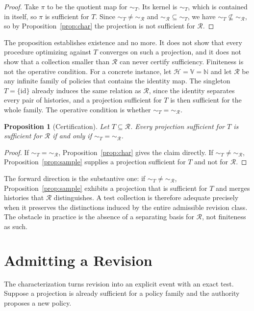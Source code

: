 \documentclass[11pt]{article}
\newtheorem{proposition}{Proposition}
\theoremstyle{remark}
\newcommand{\Hist}{\mathcal{H}}
\newcommand{\Rev}{\mathcal{R}}
\newcommand{\Vset}{\mathbb{V}}
\begin{document}
\begin{proof}
Take $\pi$ to be the quotient map for $\sim_T$. Its kernel is $\sim_T$, which is contained in itself, so $\pi$ is sufficient for $T$. Since $\sim_T\ne\sim_{\Rev}$ and $\sim_{\Rev}\subseteq\sim_T$, we have $\sim_T\not\subseteq\sim_{\Rev}$, so by Proposition~\ref{prop:char} the projection is not sufficient for $\Rev$.
\end{proof}

The proposition establishes existence and no more. It does not show that every procedure optimizing against $T$ converges on such a projection, and it does not show that a collection smaller than $\Rev$ can never certify sufficiency. Finiteness is not the operative condition. For a concrete instance, let $\Hist=\Vset=\mathbb{N}$ and let $\Rev$ be any infinite family of policies that contains the identity map. The singleton $T=\{\mathrm{id}\}$ already induces the same relation as $\Rev$, since the identity separates every pair of histories, and a projection sufficient for $T$ is then sufficient for the whole family. The operative condition is whether $\sim_T=\sim_{\Rev}$.

\begin{proposition}[Certification]\label{prop:cert}
Let $T\subseteq\Rev$. Every projection sufficient for $T$ is sufficient for $\Rev$ if and only if $\sim_T=\sim_{\Rev}$.
\end{proposition}

\begin{proof}
If $\sim_T=\sim_{\Rev}$, Proposition~\ref{prop:char} gives the claim directly. If $\sim_T\ne\sim_{\Rev}$, Proposition~\ref{prop:sample} supplies a projection sufficient for $T$ and not for $\Rev$.
\end{proof}

The forward direction is the substantive one: if $\sim_T\ne\sim_{\Rev}$, Proposition~\ref{prop:sample} exhibits a projection that is sufficient for $T$ and merges histories that $\Rev$ distinguishes. A test collection is therefore adequate precisely when it preserves the distinctions induced by the entire admissible revision class. The obstacle in practice is the absence of a separating basis for $\Rev$, not finiteness as such.

\section{Admitting a Revision}\label{sec:admit}

The characterization turns revision into an explicit event with an exact test. Suppose a projection is already sufficient for a policy family and the authority proposes a new policy.
\end{document}
